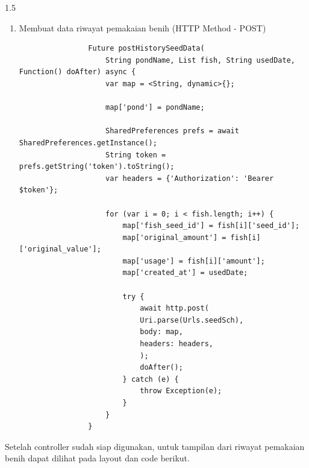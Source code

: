 \begin{spacing}{1.5}
\begin{enumerate}
\begin{enumerate}
\begin{lstlisting}
						SharedPreferences prefs = await SharedPreferences.getInstance();
						String token = prefs.getString('token').toString();
						var headers = {'Authorization': 'Bearer $token'};
					
						final response = await http.get(
							Uri.parse(
								'${Urls.seedSch}?start_date=$firstDate&end_date=$lastDate&name=$name'),
							headers: headers,
						);
					
						try {
							if (response.statusCode == 200) {
							HistorySeedModel res =
								HistorySeedModel.fromJson(jsonDecode(response.body));
					
							if (isReversed) {
								var temp = res;
								seedHistoryList.value.data = temp.data!.reversed.toList();
							} else {
								var temp = res;
								seedHistoryList.value.data = temp.data!;
							}
					
							doAfter();
							}
						} catch (e) {
							throw Exception(e);
						}
						isLoadingHistory.value = false;
					}
			\end{lstlisting}

			\item Membuat data riwayat pemakaian benih (HTTP Method - POST)
			
			\begin{lstlisting}
				Future postHistorySeedData(
					String pondName, List fish, String usedDate, Function() doAfter) async {
					var map = <String, dynamic>{};

					map['pond'] = pondName;

					SharedPreferences prefs = await SharedPreferences.getInstance();
					String token = prefs.getString('token').toString();
					var headers = {'Authorization': 'Bearer $token'};

					for (var i = 0; i < fish.length; i++) {
						map['fish_seed_id'] = fish[i]['seed_id'];
						map['original_amount'] = fish[i]['original_value'];
						map['usage'] = fish[i]['amount'];
						map['created_at'] = usedDate;

						try {
							await http.post(
							Uri.parse(Urls.seedSch),
							body: map,
							headers: headers,
							);
							doAfter();
						} catch (e) {
							throw Exception(e);
						}
					}
				}
			\end{lstlisting}
		\end{enumerate}

		Setelah controller sudah siap digunakan, untuk tampilan dari riwayat pemakaian benih dapat dilihat pada layout dan code berikut.


\end{enumerate}
\end{spacing}
